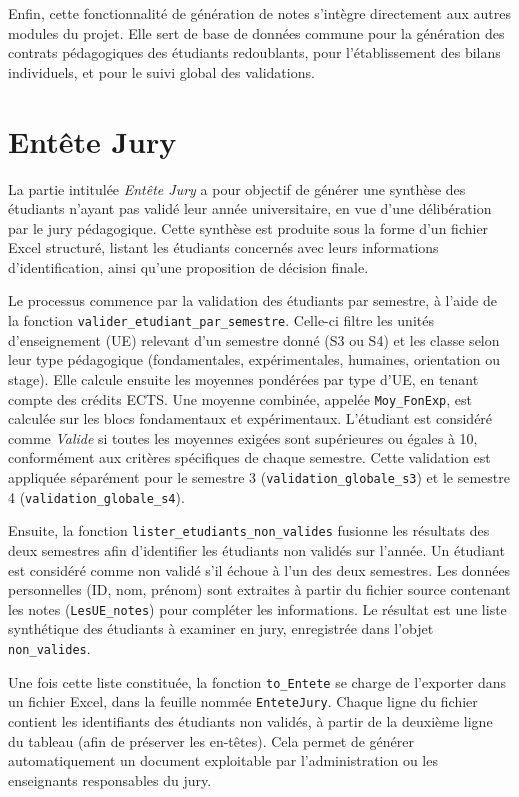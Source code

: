 \documentclass{article}
\begin{document}
Enfin, cette fonctionnalité de génération de notes s’intègre directement aux autres modules du projet. Elle sert de base de données commune pour la génération des contrats pédagogiques des étudiants redoublants, pour l’établissement des bilans individuels, et pour le suivi global des validations.

\section{Entête Jury}

La partie intitulée \textit{Entête Jury} a pour objectif de générer une synthèse des étudiants n’ayant pas validé leur année universitaire, en vue d’une délibération par le jury pédagogique. Cette synthèse est produite sous la forme d’un fichier Excel structuré, listant les étudiants concernés avec leurs informations d’identification, ainsi qu’une proposition de décision finale.

Le processus commence par la validation des étudiants par semestre, à l’aide de la fonction \texttt{valider\_etudiant\_par\_semestre}. Celle-ci filtre les unités d’enseignement (UE) relevant d’un semestre donné (S3 ou S4) et les classe selon leur type pédagogique (fondamentales, expérimentales, humaines, orientation ou stage). Elle calcule ensuite les moyennes pondérées par type d’UE, en tenant compte des crédits ECTS. Une moyenne combinée, appelée \texttt{Moy\_FonExp}, est calculée sur les blocs fondamentaux et expérimentaux. L'étudiant est considéré comme \textit{Valide} si toutes les moyennes exigées sont supérieures ou égales à 10, conformément aux critères spécifiques de chaque semestre. Cette validation est appliquée séparément pour le semestre 3 (\texttt{validation\_globale\_s3}) et le semestre 4 (\texttt{validation\_globale\_s4}).

Ensuite, la fonction \texttt{lister\_etudiants\_non\_valides} fusionne les résultats des deux semestres afin d’identifier les étudiants non validés sur l’année. Un étudiant est considéré comme non validé s’il échoue à l’un des deux semestres. Les données personnelles (ID, nom, prénom) sont extraites à partir du fichier source contenant les notes (\texttt{LesUE\_notes}) pour compléter les informations. Le résultat est une liste synthétique des étudiants à examiner en jury, enregistrée dans l’objet \texttt{non\_valides}.

Une fois cette liste constituée, la fonction \texttt{to\_Entete} se charge de l’exporter dans un fichier Excel, dans la feuille nommée \texttt{EnteteJury}. Chaque ligne du fichier contient les identifiants des étudiants non validés, à partir de la deuxième ligne du tableau (afin de préserver les en-têtes). Cela permet de générer automatiquement un document exploitable par l’administration ou les enseignants responsables du jury.
\end{document}

